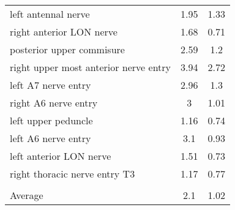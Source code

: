 \begin{tabular}{lcc}
 left antennal nerve                         & 1.95          & 1.33             \\
 right anterior LON nerve                    & 1.68          & 0.71             \\
 posterior upper commisure                   & 2.59          & 1.2              \\
 right upper most anterior nerve entry       & 3.94          & 2.72             \\
 left A7 nerve entry                         & 2.96          & 1.3              \\
 right A6 nerve entry                        & 3             & 1.01             \\
 left upper peduncle                         & 1.16          & 0.74             \\
 left A6 nerve entry                         & 3.1           & 0.93             \\
 left anterior LON nerve                     & 1.51          & 0.73             \\
 right thoracic nerve entry T3               & 1.17          & 0.77             \\
                                             &               &                  \\ \hline \hline
 Average                                     & 2.1           & 1.02             \\
\hline
\end{tabular}